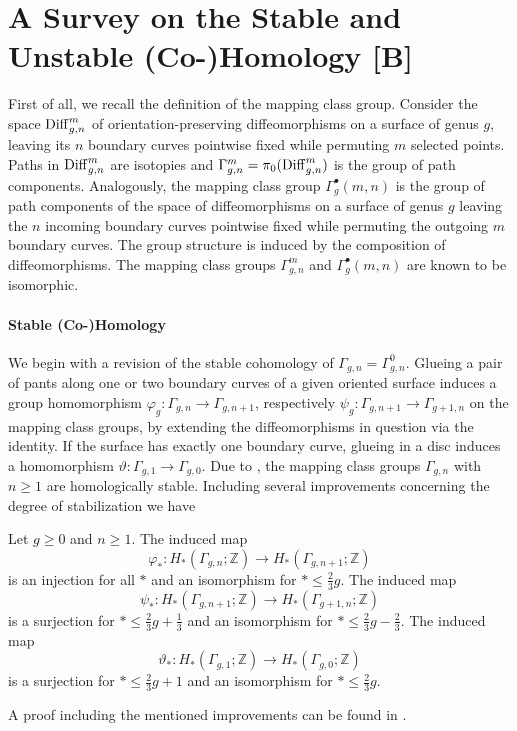 \section{A Survey on the Stable and Unstable (Co-)Homology [B]}
First of all, we recall the definition of the mapping class group.
Consider the space $\operatorname{Diff}_{g,n}^{m}$ of orientation-preserving diffeomorphisms on a surface of genus $g$, leaving its $n$ boundary curves pointwise fixed while permuting $m$ selected points.
Paths in $\operatorname{Diff}_{g,n}^{m}$ are isotopies and $\Gamma_{g,n}^m = \pi_0(\operatorname{Diff}_{g,n}^m)$ is the group of path components.
Analogously, the mapping class group $\Gamma_g^\bullet(m,n)$ is the group of path components of the space of diffeomorphisms on a surface of genus $g$ leaving the $n$ incoming boundary curves pointwise fixed while permuting the outgoing $m$ boundary curves.
The group structure is induced by the composition of diffeomorphisms.
The mapping class groups $\Gamma_{g,n}^m$ and $\Gamma_g^\bullet(m,n)$ are known to be isomorphic.

\paragraph{Stable (Co-)Homology}
We begin with a revision of the stable cohomology of $\Gamma_{g,n} = \Gamma_{g,n}^0$.
Glueing a pair of pants along one or two boundary curves of a given oriented surface induces a group homomorphism
$\varphi_g \colon \Gamma_{g,n} \to \Gamma_{g,n+1}$, respectively $\psi_g \colon \Gamma_{g, n+1} \to \Gamma_{g+1,n}$ on the mapping class groups,
by extending the diffeomorphisms in question via the identity.
If the surface has exactly one boundary curve, glueing in a disc induces a homomorphism $\vartheta \colon \Gamma_{g,1} \to \Gamma_{g,0}$.
Due to \cite{Harer1985}, the mapping class groups $\Gamma_{g,n}$ with $n \ge 1$ are homologically stable.
Including several improvements concerning the degree of stabilization we have
\begin{thm*}[Harer]
    Let $g \ge 0$ and $n \ge 1$.
    The induced map
    \[
        \varphi_\ast \colon H_\ast( \Gamma_{g,n}; \mathbb Z ) \to H_\ast( \Gamma_{g,n+1}; \mathbb Z)
    \]
    is an injection for all $\ast$ and an isomorphism for $\ast \le \frac{2}{3}g$.
    The induced map
    \[
        \psi_\ast \colon H_\ast( \Gamma_{g,n+1}; \mathbb Z ) \to H_\ast( \Gamma_{g+1,n}; \mathbb Z)
    \]
    is a surjection for $\ast \le \frac{2}{3}g + \frac{1}{3}$ and an isomorphism for $\ast \le \frac{2}{3}g - \frac{2}{3}$.
    The induced map
    \[
        \vartheta_\ast \colon H_\ast( \Gamma_{g,1}; \mathbb Z ) \to H_\ast( \Gamma_{g,0}; \mathbb Z)
    \]
    is a surjection for $\ast \le \frac{2}{3}g + 1$ and an isomorphism for $\ast \le \frac{2}{3}g$.
\end{thm*}
\label{page:stabilization_map}%
A proof including the mentioned improvements can be found in \cite{Wahl2012}.

